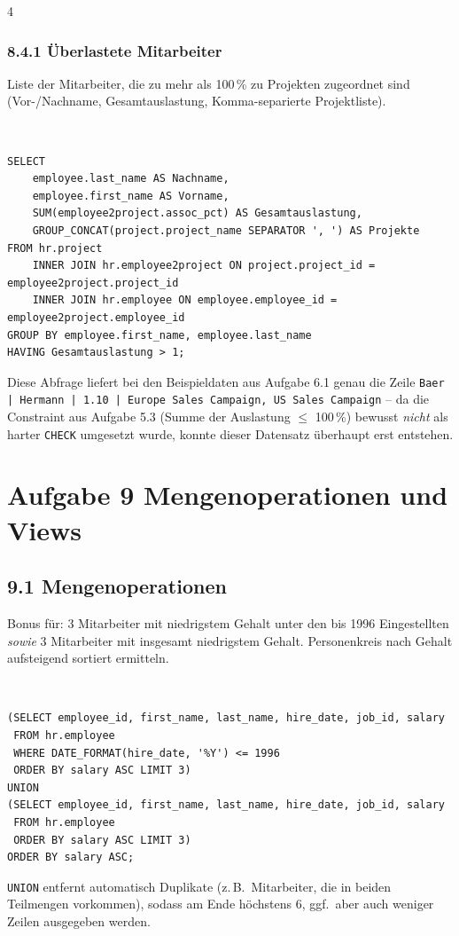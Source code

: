 \documentclass[8pt,a4paper]{extarticle}
\newcommand{\Kopf}[1]{}
\newenvironment{loesung}[1][]{%
    \par\noindent{\bfseries\color{loesungrahmen}\small$\blacktriangleright$~L\"osung#1:}~%
}{\par\smallskip}
\begin{document}
\begin{multicols}{4}
\subsubsection*{8.4.1 \quad \"Uberlastete Mitarbeiter}
Liste der Mitarbeiter, die zu mehr als 100\,\% zu Projekten zugeordnet sind (Vor-/Nachname, Gesamtauslastung, Komma-separierte Projektliste).
\begin{loesung}
\begin{lstlisting}
SELECT
    employee.last_name AS Nachname,
    employee.first_name AS Vorname,
    SUM(employee2project.assoc_pct) AS Gesamtauslastung,
    GROUP_CONCAT(project.project_name SEPARATOR ', ') AS Projekte
FROM hr.project
    INNER JOIN hr.employee2project ON project.project_id = employee2project.project_id
    INNER JOIN hr.employee ON employee.employee_id = employee2project.employee_id
GROUP BY employee.first_name, employee.last_name
HAVING Gesamtauslastung > 1;
\end{lstlisting}
Diese Abfrage liefert bei den Beispieldaten aus Aufgabe 6.1 genau die Zeile \texttt{Baer | Hermann | 1.10 | Europe Sales Campaign, US Sales Campaign} -- da die Constraint aus Aufgabe 5.3 (Summe der Auslastung $\leq$ 100\,\%) bewusst \emph{nicht} als harter \texttt{CHECK} umgesetzt wurde, konnte dieser Datensatz \"uberhaupt erst entstehen.
\end{loesung}


\section*{Aufgabe 9 \quad Mengenoperationen und Views}
\Kopf{Aufgabe 9 Mengenoperationen und Views}

\subsection*{9.1 \quad Mengenoperationen}
Bonus f\"ur: 3 Mitarbeiter mit niedrigstem Gehalt unter den bis 1996 Eingestellten \emph{sowie} 3 Mitarbeiter mit insgesamt niedrigstem Gehalt. Personenkreis nach Gehalt aufsteigend sortiert ermitteln.
\begin{loesung}
\begin{lstlisting}
(SELECT employee_id, first_name, last_name, hire_date, job_id, salary
 FROM hr.employee
 WHERE DATE_FORMAT(hire_date, '%Y') <= 1996
 ORDER BY salary ASC LIMIT 3)
UNION
(SELECT employee_id, first_name, last_name, hire_date, job_id, salary
 FROM hr.employee
 ORDER BY salary ASC LIMIT 3)
ORDER BY salary ASC;
\end{lstlisting}
\texttt{UNION} entfernt automatisch Duplikate (z.\,B.\ Mitarbeiter, die in beiden Teilmengen vorkommen), sodass am Ende h\"ochstens 6, ggf.\ aber auch weniger Zeilen ausgegeben werden.
\end{loesung}


\end{multicols}
\end{document}
